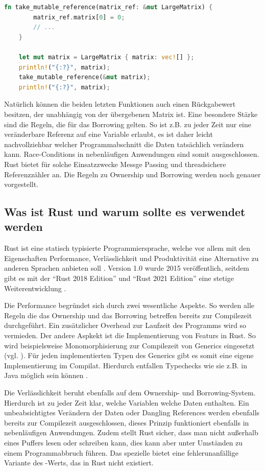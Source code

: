 \documentclass[11pt,a4paper, ngerman]{article}
\begin{document}
\begin{lstlisting}[language=rust, caption={Einführendes Beispiel: Veränderliche Referenz}]
    fn take_mutable_reference(matrix_ref: &mut LargeMatrix) {
        matrix_ref.matrix[0] = 0;
        // ...
    }

    let mut matrix = LargeMatrix { matrix: vec![] };
    println!("{:?}", matrix);
    take_mutable_reference(&mut matrix);
    println!("{:?}", matrix);
\end{lstlisting}

Natürlich können die beiden letzten Funktionen auch einen Rückgabewert besitzen, der unabhängig von der übergebenen Matrix ist. Eine besondere Stärke sind die Regeln, die für das Borrowing gelten. So ist z.B. zu jeder Zeit nur eine veränderbare Referenz auf eine Variable erlaubt, es ist daher leicht nachvollziehbar welcher Programmabschnitt die Daten tatsächlich verändern kann. Race-Conditions in nebenläufigen Anwendungen sind somit ausgeschlossen. Rust bietet für solche Einsatzzwecke Messge Passing \cite{K1727} und threadsichere Referenzzähler \cite{ArcSrc} an. Die Regeln zu Ownership und Borrowing werden noch genauer vorgestellt.

\label{sec:kap3d2}
\subsection{Was ist Rust und warum sollte es verwendet werden}
Rust ist eine statisch typisierte Programmiersprache, welche vor allem mit den Eigenschaften Performance, Verlässlichkeit und Produktivität eine Alternative zu anderen Sprachen anbieten soll \cite{RustPromises}. Version 1.0 wurde 2015 veröffentlich, seitdem gibt es mit der ``Rust 2018 Edition'' und ``Rust 2021 Edition'' eine stetige Weiterentwicklung \cite{RustEditions}.

Die Performance begründet sich durch zwei wesentliche Aspekte. So werden alle Regeln die das Ownership und das Borrowing betreffen bereits zur Compilezeit durchgeführt. Ein zusätzlicher Overhead zur Laufzeit des Programms wird so vermieden. Der andere Aspkekt ist die Implementierung von Featurs in Rust. So wird beispielsweise Monomorphisierung zur Compilezeit von Generics eingesetzt (vgl. \cite[S. 196 ff.]{SK19}). Für jeden implementierten Typen des Generics gibt es somit eine eigene Implementierung im Compilat. Hierdurch entfallen Typechecks wie sie z.B. in Java möglich sein können \cite{JavaGenerics}.

Die Verlässlichkeit beruht ebenfalls auf dem Ownership- und Borrowing-System. Hierdurch ist zu jeder Zeit klar, welche Variablen welche Daten enthalten. Ein unbeabsichtigtes Verändern der Daten oder Dangling References werden ebenfalls bereits zur Compilezeit ausgeschlossen, dieses Prinzip funktioniert ebenfalls in nebenläufigen Anwendungen. Zudem stellt Rust sicher, dass man nicht außerhalb eines Puffers lesen oder schreiben kann, dies kann aber unter Umständen zu einem Programmabbruch führen. Das spezielle   bietet eine fehlerunanfällige Variante des -Werts, das in Rust nicht existiert.
\end{document}
